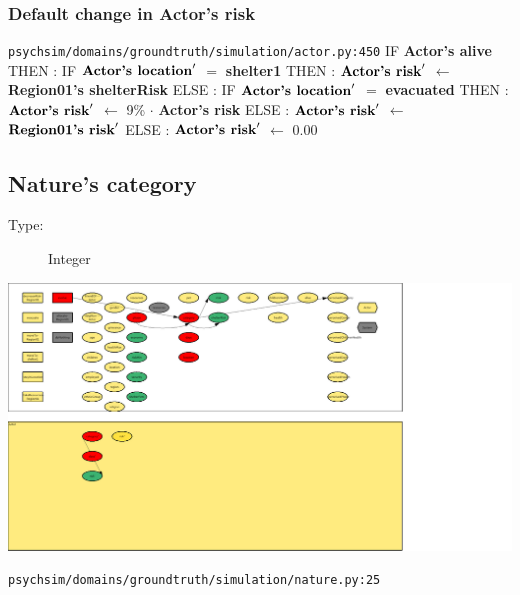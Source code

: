 \documentclass{article}%
\begin{document}
%
\subsubsection{Default change in Actor's risk}%
\label{ssubsec:Default change in Actor's risk}%
\begin{flushleft}%
\verb|psychsim/domains/groundtruth/simulation/actor.py:450|%
\linebreak%
IF %
\textbf{Actor's alive}%
\linebreak%
\hspace*{2em}%
THEN %
: %
IF %
$\mbox{\textbf{Actor's location}} '$%
$=$%
\textbf{shelter1}%
\linebreak%
\hspace*{4em}%
THEN %
: %
$\mbox{\textbf{Actor's risk}} '$%
$\leftarrow$%
\textbf{Region01's shelterRisk}%
\linebreak%
\hspace*{4em}%
ELSE %
: %
IF %
$\mbox{\textbf{Actor's location}} '$%
$=$%
\textbf{evacuated}%
\linebreak%
\hspace*{6em}%
THEN %
: %
$\mbox{\textbf{Actor's risk}} '$%
$\leftarrow$%
9\%%
$\cdot$%
\textbf{Actor's risk}%
\linebreak%
\hspace*{6em}%
ELSE %
: %
$\mbox{\textbf{Actor's risk}} '$%
$\leftarrow$%
$\mbox{\textbf{Region01's risk}} '$%
\linebreak%
\hspace*{2em}%
ELSE %
: %
$\mbox{\textbf{Actor's risk}} '$%
$\leftarrow$%
0.00%
\end{flushleft}

%
\subsection{Nature's category}%
\label{subsec:Nature's category}%
\begin{description}%
\item[Type:]%
Integer%
\end{description}%
\includegraphics[width=\textwidth]{images/categoryOfNature.png}%
\begin{flushleft}%
\verb|psychsim/domains/groundtruth/simulation/nature.py:25|%
\end{flushleft}%
\end{document}

